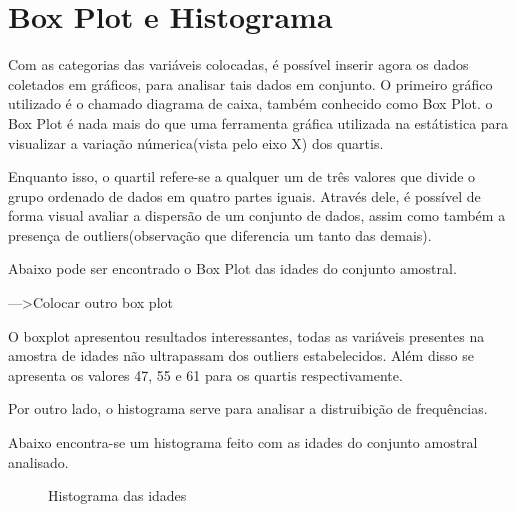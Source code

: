 \chapter{Box Plot e Histograma}

    \setcounter{section}{0}

    Com as categorias das variáveis colocadas, é possível inserir agora os dados coletados em gráficos, para 
    analisar tais dados em conjunto. O primeiro gráfico utilizado é o chamado diagrama de caixa, também conhecido
    como Box Plot. o Box Plot é nada mais do que uma ferramenta gráfica utilizada na estátistica para visualizar 
    a variação númerica(vista pelo eixo X) dos quartis.

    Enquanto isso, o quartil refere-se a qualquer um de três valores que divide o grupo ordenado de dados em quatro partes 
    iguais. Através dele, é possível de forma visual avaliar a dispersão de um conjunto de dados, assim como também a presença 
    de outliers(observação que diferencia um tanto das demais).

    Abaixo pode ser encontrado o Box Plot das idades do conjunto amostral.

    --->Colocar outro box plot

    O boxplot apresentou resultados interessantes, todas as variáveis presentes na 
    amostra de idades não ultrapassam dos outliers estabelecidos. Além disso se 
    apresenta os valores 47, 55 e 61 para os quartis respectivamente.  
    
    Por outro lado, o histograma serve para analisar a distruibição de frequências.

    Abaixo encontra-se um histograma feito com as idades do conjunto amostral analisado.

    \begin{figure}[H]
        \centering
        \caption{Histograma das idades}  
    \end{figure}

